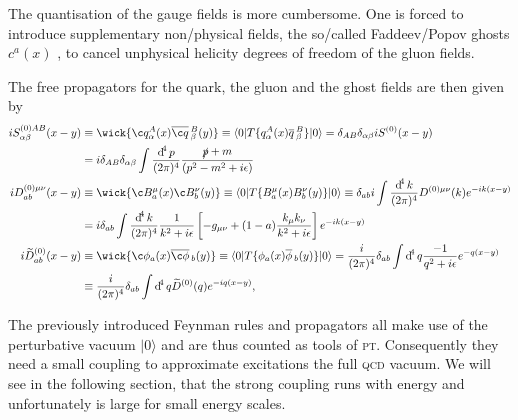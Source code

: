 \documentclass[../../index.tex]{subfiles}
\begin{document}
The quantisation of the gauge fields is more cumbersome. One is forced to
introduce supplementary non\-/physical fields, the so\-/called Faddeev\-/Popov
ghosts $c^a(x)$ \cite{Faddeev1967}, to cancel unphysical helicity degrees of
freedom of the gluon fields.

The free propagators for the quark, the gluon and the ghost fields are then
given by
\begin{equation}
  \begin{split}
    i S^{(0)AB}_{\alpha\beta}(x-y) &\equiv \wick{ \c q_\alpha^A(x) \anti{\c
        q}_\beta^B(y)} \equiv \langle 0 \vert T \{ q_\alpha^A(x)
    \anti{q}_\beta^B \} \vert 0 \rangle
    = \delta_{AB} \delta_{\alpha\beta} i S^{(0)}(x-y) \\
    &= i \delta_{AB}\delta_{\alpha\beta}\int \fdif{p} \frac{\slashed p + m}{(p^2 - m^2 + i\epsilon)}\\
    i D^{(0)\mu\nu}_{ab}(x-y) &\equiv \wick{ \c B_a^\mu(x) \c B_b^\nu(y)} \equiv
    \langle 0 \vert T \{ B_a^\mu(x) B_b^\nu(y) \} \vert 0 \rangle
    \equiv \delta_{ab}i \int \frac{\dif^4 k}{(2\pi)^4} D^{(0)\mu\nu}(k) e^{-ik(x-y)} \\
    &= i \delta_{ab} \int \frac{\dif^4 k}{(2\pi)^4} \frac{1}{k^2+i\epsilon} \left[ -g_{\mu\nu} + (1-a) \frac{k_\mu k_\nu}{k^2+i\epsilon} \right] e^{-ik(x-y)} \\
    i \widetilde{D}_{ab}^{(0)}(x-y) & \equiv \wick{\c \phi_a(x) \anti{\c
        \phi}_b(y)} \equiv \langle 0 \vert T\{ \phi_a(x) \anti{\phi}_b(y) \}
    \vert 0 \rangle
    = \frac{i}{(2\pi)^4}\delta_{ab} \int \dif^4 q \frac{-1}{q^2 + i\epsilon} e^{-q(x-y)} \\
    &\equiv \frac{i}{(2\pi)^4} \delta_{ab} \int \dif^4 q \widetilde{D}^{(0)}(q)
    e^{-iq(x-y)},
  \end{split}
\end{equation}

The previously introduced Feynman rules and propagators all make use of the
perturbative vacuum \(\vert 0 \rangle\) and are thus counted as tools of
\textsc{pt}. Consequently they need a small coupling to approximate excitations
the full \textsc{qcd} vacuum. We will see in the following section, that the
strong coupling runs with energy and unfortunately is large for small energy
scales.
\end{document}
